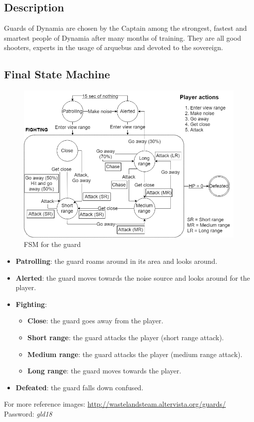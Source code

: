 \subsection{Description}
Guards of Dynamia are chosen by the Captain among the strongest, fastest and smartest people of Dynamia after many months of training. They are all good shooters, experts in the usage of arquebus and devoted to the sovereign.

\subsection{Final State Machine}
\begin{figure}[H]
  \centering
  \includegraphics[width=\textwidth]{Images/Diagrams/FSMs/guardFSM}
  \caption{FSM for the guard}
\end{figure}

\begin{itemize}
	\item \textbf{Patrolling}: the guard roams around in its area and looks around.
	\item \textbf{Alerted}: the guard moves towards the noise source and looks around for the player.
	\item \textbf{Fighting}:
	\begin{itemize}
		\item \textbf{Close}: the guard goes away from the player.
		\item \textbf{Short range}: the guard attacks the player (short range attack).
		\item \textbf{Medium range}: the guard attacks the player (medium range attack).
		\item \textbf{Long range}: the guard moves towards the player.
	\end{itemize}
	\item \textbf{Defeated}: the guard falls down confused.
\end{itemize}

For more reference images: \url{http://wastelandsteam.altervista.org/guards/}\\
Password: \textit{gld18}

